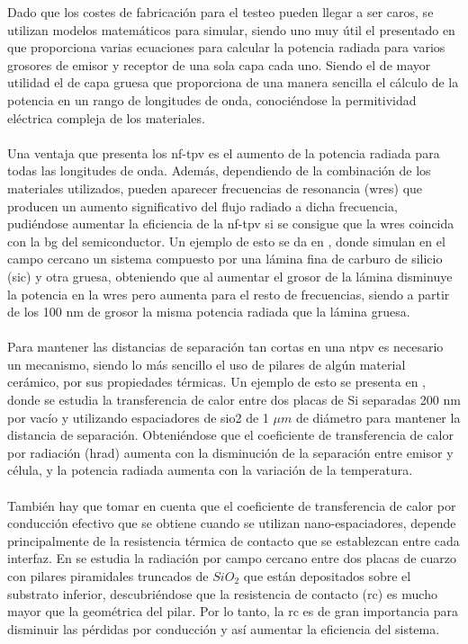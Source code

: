 Dado que los costes de fabricación para el testeo pueden llegar a ser caros, se utilizan modelos matemáticos para simular, siendo uno muy útil el presentado en \cite{nfTPV_equations} que proporciona varias ecuaciones para calcular la potencia radiada para varios grosores de emisor y receptor de una sola capa cada uno. Siendo el de mayor utilidad el de capa gruesa que proporciona de una manera sencilla el cálculo de la potencia en un rango de longitudes de onda, conociéndose la permitividad eléctrica compleja de los materiales.\\\\
Una ventaja que presenta los \acrshort{nf-tpv} es el aumento de la potencia radiada para todas las longitudes de onda. Además, dependiendo de la combinación de los materiales utilizados, pueden aparecer frecuencias de resonancia (\gls{wres}) que producen un aumento significativo del flujo radiado a dicha frecuencia, pudiéndose aumentar la eficiencia de la \acrshort{nf-tpv} si se consigue que la \gls{wres} coincida con la \acrshort{bg} del semiconductor. Un ejemplo de esto se da en \cite{doi:Near_field_ThinFilm}, donde simulan en el campo cercano un sistema compuesto por una lámina fina de carburo de silicio (\gls{sic}) y otra gruesa, obteniendo que al aumentar el grosor de la lámina disminuye la potencia en la \gls{wres} pero aumenta para el resto de frecuencias, siendo a partir de los 100 nm de grosor la misma potencia radiada que la lámina gruesa.\\\\
Para mantener las distancias de separación tan cortas en una \acrshort{ntpv} es necesario un mecanismo, siendo lo más sencillo el uso de pilares de algún material cerámico, por sus propiedades térmicas. Un ejemplo de esto se presenta en \cite{NearField200}, donde se estudia la transferencia de calor entre dos placas de Si separadas 200 nm por vacío y utilizando espaciadores de \gls{sio2} de 1 $\mu m$ de diámetro para mantener la distancia de separación. Obteniéndose que el coeficiente de transferencia de calor por radiación (\gls{hrad}) aumenta con la disminución de la separación entre emisor y célula, y la potencia radiada aumenta con la variación de la temperatura.\\\\
También hay que tomar en cuenta que el coeficiente de transferencia de calor por conducción efectivo que se obtiene cuando se utilizan nano-espaciadores, depende principalmente de la resistencia térmica de contacto que se establezcan entre cada interfaz. En \cite{nf_TPV_Pillars_SiO2} se estudia la radiación por campo cercano entre dos placas de cuarzo con pilares piramidales truncados de $SiO_2$ que están depositados sobre el substrato inferior, descubriéndose que la resistencia de contacto (\acrshort{rc}) es mucho mayor que la geométrica del pilar. Por lo tanto, la \acrshort{rc} es de gran importancia para disminuir las pérdidas por conducción y así aumentar la eficiencia del sistema.
